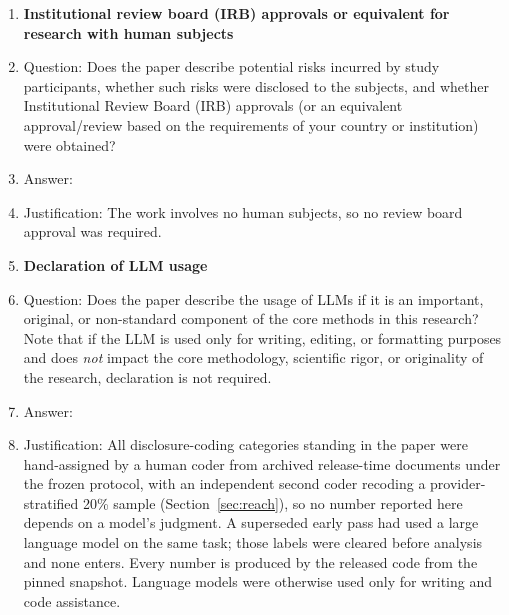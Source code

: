 \documentclass{article}
\begin{document}
\begin{enumerate}
\item {\bf Institutional review board (IRB) approvals or equivalent for research with human subjects}
    \item[] Question: Does the paper describe potential risks incurred by study participants, whether such risks were disclosed to the subjects, and whether Institutional Review Board (IRB) approvals (or an equivalent approval/review based on the requirements of your country or institution) were obtained?
    \item[] Answer: \answerNA{}
    \item[] Justification: The work involves no human subjects, so no review board approval was required.


\item {\bf Declaration of LLM usage}
    \item[] Question: Does the paper describe the usage of LLMs if it is an important, original, or non-standard component of the core methods in this research? Note that if the LLM is used only for writing, editing, or formatting purposes and does \emph{not} impact the core methodology, scientific rigor, or originality of the research, declaration is not required.
    \item[] Answer: \answerYes{}
    \item[] Justification: All disclosure-coding categories standing in the paper were hand-assigned by a human coder from archived release-time documents under the frozen protocol, with an independent second coder recoding a provider-stratified 20\% sample (Section~\ref{sec:reach}), so no number reported here depends on a model's judgment. A superseded early pass had used a large language model on the same task; those labels were cleared before analysis and none enters. Every number is produced by the released code from the pinned snapshot. Language models were otherwise used only for writing and code assistance.


\end{enumerate}
\end{document}
